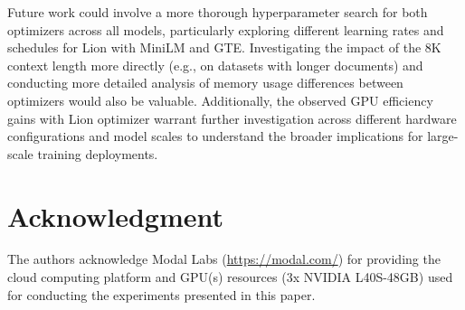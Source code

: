 \documentclass[conference]{IEEEtran}
\begin{document}
Future work could involve a more thorough hyperparameter search for both optimizers across all models, particularly exploring different learning rates and schedules for Lion with MiniLM and GTE. Investigating the impact of the 8K context length more directly (e.g., on datasets with longer documents) and conducting more detailed analysis of memory usage differences between optimizers would also be valuable. Additionally, the observed GPU efficiency gains with Lion optimizer warrant further investigation across different hardware configurations and model scales to understand the broader implications for large-scale training deployments.

\section*{Acknowledgment}
The authors acknowledge Modal Labs (\url{https://modal.com/}) for providing the cloud computing platform and GPU(s) resources (3x NVIDIA L40S-48GB) used for conducting the experiments presented in this paper.


 
\end{document}
